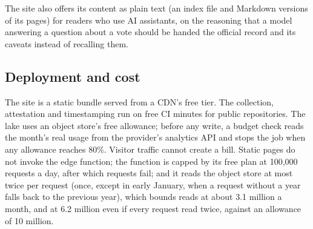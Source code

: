 The site also offers its content as plain text (an index file and Markdown versions of its pages) for readers who use AI assistants, on the reasoning that a model answering a question about a vote should be handed the official record and its caveats instead of recalling them.

\subsection{Deployment and cost}
\label{sec:deploy}

The site is a static bundle served from a CDN's free tier. The collection, attestation and timestamping run on free CI minutes for public repositories. The lake uses an object store's free allowance; before any write, a budget check reads the month's real usage from the provider's analytics API and stops the job when any allowance reaches 80\%. Visitor traffic cannot create a bill. Static pages do not invoke the edge function; the function is capped by its free plan at 100,000 requests a day, after which requests fail; and it reads the object store at most twice per request (once, except in early January, when a request without a year falls back to the previous year), which bounds reads at about 3.1 million a month, and at 6.2 million even if every request read twice, against an allowance of 10 million.
